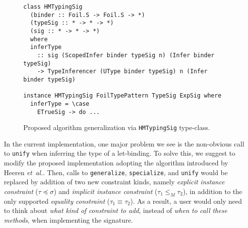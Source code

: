 \begin{figure}[H]
\begin{verbatim}
class HMTypingSig
  (binder :: Foil.S -> Foil.S -> *)
  (typeSig :: * -> * -> *)
  (sig :: * -> * -> *) 
  where
  inferType
    :: sig (ScopedInfer binder typeSig n) (Infer binder typeSig)
    -> TypeInferencer (UType binder typeSig) n (Infer binder typeSig)

instance HMTypingSig FoilTypePattern TypeSig ExpSig where
  inferType = \case
    ETrueSig -> do ...
\end{verbatim}
  \caption[Proposed \texttt{HMTypingSig} type-class]{Proposed algorithm generalization via \texttt{HMTypingSig} type-class.}
  \label{fig:HMTypingSig}
\end{figure}

In the current implementation, one major problem we see is the non-obvious call to \texttt{unify} when inferring the type of a let-binding. To solve this, we suggest to modify the proposed implementation adopting the algorithm introduced by Heeren \emph{et~al.}\cite{Heeren2002_GeneralizingHM}. Then, calls to \texttt{generalize}, \texttt{specialize}, and \texttt{unify} would be replaced by addition of two new constraint kinds, namely \emph{explicit instance constraint} ($\tau \preceq \sigma$) and \emph{implicit instance constraint} ($\tau_1 \leq_M \tau_2$), in addition to the only supported \emph{equality constraint} ($\tau_1 \equiv \tau_2$). As a result, a user would only need to think about \emph{what kind of constraint to add}, instead of \emph{when to call these methods}, when implementing the signature.
